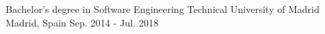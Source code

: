 

\begin{cventries}

  \cventry
    {Bachelor's degree in Software Engineering} %
    {Technical University of Madrid} %
    {Madrid, Spain} %
    {Sep. 2014 - Jul. 2018} %


\end{cventries}
